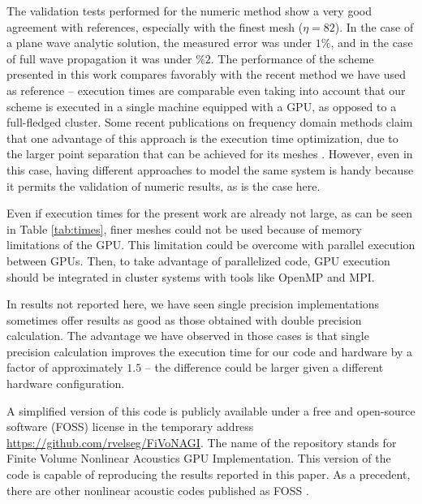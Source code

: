 The validation tests performed for the numeric method show a very good agreement with references, especially with the finest mesh ($\eta=82$). 
In the case of a plane wave analytic solution, the measured error was under $1\%$, and in the case of full wave propagation it was under $\%2$. 
The performance of the scheme presented in this work compares favorably with the recent method we have used as reference \citep{albin} -- execution times are comparable even taking into account that our scheme is executed in a single machine equipped with a GPU, as opposed to a full-fledged cluster.
Some recent publications on frequency domain methods claim that one advantage of this approach is the execution time optimization, due to the larger point separation that can be achieved for its meshes \citep{albin, huijssen2010iterative}. 
However, even in this case, having different approaches to model the same system is handy because it permits the validation of numeric results, as is the case here.

Even if execution times for the present work are already not large, as can be seen in Table \ref{tab:times},  finer meshes could not be used because of memory limitations of the GPU. 
This limitation could be overcome with parallel execution between GPUs. 
Then, to take advantage of parallelized code, GPU execution should be integrated in cluster systems with tools like OpenMP and MPI. 

In results not reported here, we have seen single precision implementations sometimes offer results as good as those obtained with double precision calculation.
The advantage we have observed in those cases is that single precision calculation improves the execution time for our code and hardware by a factor of approximately $1.5$ -- the difference could be larger given a different hardware configuration.

A simplified version of this code 
is publicly available under a free and open-source software (FOSS) license in the temporary address \url{https://github.com/rvelseg/FiVoNAGI}.
The name of the repository stands for Finite Volume Nonlinear Acoustics GPU Implementation. This version of the code is capable of reproducing the results reported in this paper. As a precedent, there are other nonlinear acoustic codes published as FOSS \citep{frijlink2008abersim,anderson20002d}.

